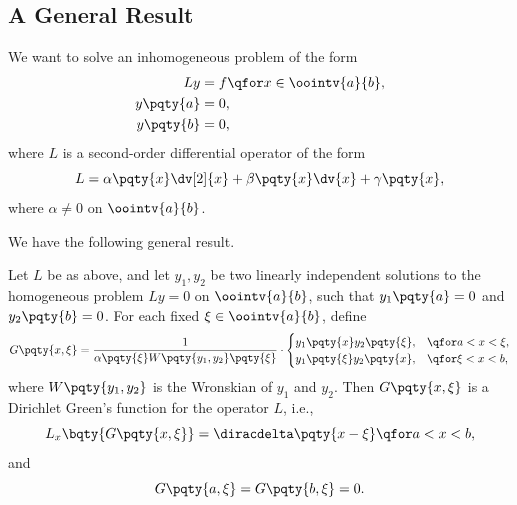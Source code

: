 \subsection{A General Result}

We want to solve an inhomogeneous problem of the form
\begin{subequations}
    \begin{align}
        Ly &= f \qfor x \in \oointv{a}{b}, \\
        y\pqty{a} &= 0, \\
        y\pqty{b} &= 0,
    \end{align}
\end{subequations}
where \(L\) is a second-order differential operator of the form
\begin{equation}
    L = \alpha\pqty{x} \dv[2]{x} + \beta\pqty{x} \dv{x} + \gamma\pqty{x},
\end{equation}
where \(\alpha \neq 0\) on \(\oointv{a}{b}\).

We have the following general result.

\begin{proposition}
    Let \(L\) be as above, and let \(y_1, y_2\) be two linearly independent solutions to the homogeneous problem \(Ly = 0\) on \(\oointv{a}{b}\), such that \(y_1\pqty{a} = 0\) and \(y_2\pqty{b} = 0\). For each fixed \(\xi \in \oointv{a}{b}\), define
    \begin{equation}
        G\pqty{x, \xi} = \frac{1}{\alpha\pqty{\xi} W\pqty{y_1, y_2} \pqty{\xi}} \cdot \begin{cases}
            y_1\pqty{x} y_2\pqty{\xi}, & \qfor a < x < \xi, \\
            y_1\pqty{\xi} y_2\pqty{x}, & \qfor \xi < x < b,
        \end{cases}
    \end{equation}
    where \(W\pqty{y_1, y_2}\) is the Wronskian of \(y_1\) and \(y_2\). Then \(G\pqty{x, \xi}\) is a Dirichlet Green's function for the operator \(L\), i.e.,
    \begin{equation}
        L_x \bqty{G\pqty{x, \xi}} = \diracdelta\pqty{x - \xi} \qfor a < x < b,
    \end{equation}
    and
    \begin{equation}
        G\pqty{a, \xi} = G\pqty{b, \xi} = 0.
    \end{equation}
\end{proposition}

